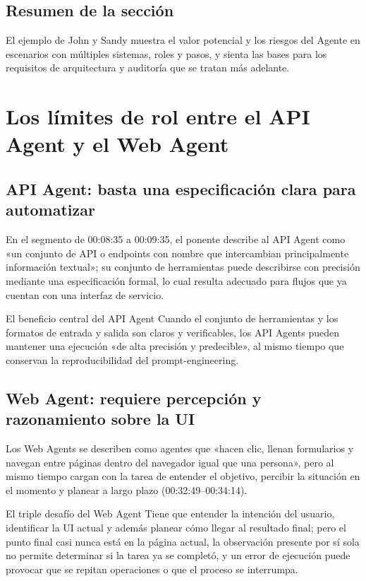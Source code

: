 \documentclass[a4paper]{article}
\begin{document}
\subsection{Resumen de la sección}
El ejemplo de John y Sandy muestra el valor potencial y los riesgos del Agente en escenarios con múltiples sistemas, roles y pasos, y sienta las bases para los requisitos de arquitectura y auditoría que se tratan más adelante.
\section{Los límites de rol entre el API Agent y el Web Agent}
\subsection{API Agent: basta una especificación clara para automatizar}
En el segmento de 00:08:35 a 00:09:35, el ponente describe al API Agent como «un conjunto de API o endpoints con nombre que intercambian principalmente información textual»; su conjunto de herramientas puede describirse con precisión mediante una especificación formal, lo cual resulta adecuado para flujos que ya cuentan con una interfaz de servicio.

\begin{knowledgebox}{El beneficio central del API Agent}
Cuando el conjunto de herramientas y los formatos de entrada y salida son claros y verificables, los API Agents pueden mantener una ejecución «de alta precisión y predecible», al mismo tiempo que conservan la reproducibilidad del prompt-engineering.
\end{knowledgebox}

\subsection{Web Agent: requiere percepción y razonamiento sobre la UI}
Los Web Agents se describen como agentes que «hacen clic, llenan formularios y navegan entre páginas dentro del navegador igual que una persona», pero al mismo tiempo cargan con la tarea de entender el objetivo, percibir la situación en el momento y planear a largo plazo (00:32:49--00:34:14).

\begin{warningbox}{El triple desafío del Web Agent}
Tiene que entender la intención del usuario, identificar la UI actual y además planear cómo llegar al resultado final; pero el punto final casi nunca está en la página actual, la observación presente por sí sola no permite determinar si la tarea ya se completó, y un error de ejecución puede provocar que se repitan operaciones o que el proceso se interrumpa.
\end{warningbox}
\end{document}
